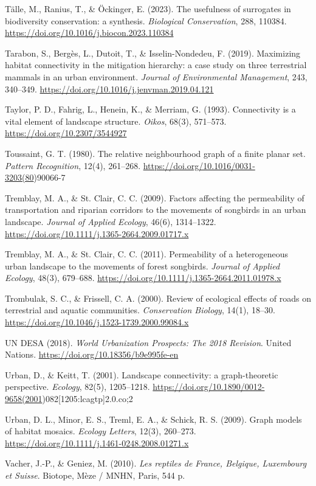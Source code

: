 \documentclass[a4paper,11pt]{report}
\begin{document}
Tälle, M., Ranius, T., \& Öckinger, E. (2023). The usefulness of surrogates in biodiversity conservation: a synthesis. \textit{Biological Conservation}, 288, 110384. \url{https://doi.org/10.1016/j.biocon.2023.110384}

Tarabon, S., Bergès, L., Dutoit, T., \& Isselin-Nondedeu, F. (2019). Maximizing habitat connectivity in the mitigation hierarchy: a case study on three terrestrial mammals in an urban environment. \textit{Journal of Environmental Management}, 243, 340--349. \url{https://doi.org/10.1016/j.jenvman.2019.04.121}

Taylor, P. D., Fahrig, L., Henein, K., \& Merriam, G. (1993). Connectivity is a vital element of landscape structure. \textit{Oikos}, 68(3), 571--573. \url{https://doi.org/10.2307/3544927}

Toussaint, G. T. (1980). The relative neighbourhood graph of a finite planar set. \textit{Pattern Recognition}, 12(4), 261--268. \url{https://doi.org/10.1016/0031-3203(80})90066-7

Tremblay, M. A., \& St. Clair, C. C. (2009). Factors affecting the permeability of transportation and riparian corridors to the movements of songbirds in an urban landscape. \textit{Journal of Applied Ecology}, 46(6), 1314--1322. \url{https://doi.org/10.1111/j.1365-2664.2009.01717.x}

Tremblay, M. A., \& St. Clair, C. C. (2011). Permeability of a heterogeneous urban landscape to the movements of forest songbirds. \textit{Journal of Applied Ecology}, 48(3), 679--688. \url{https://doi.org/10.1111/j.1365-2664.2011.01978.x}

Trombulak, S. C., \& Frissell, C. A. (2000). Review of ecological effects of roads on terrestrial and aquatic communities. \textit{Conservation Biology}, 14(1), 18--30. \url{https://doi.org/10.1046/j.1523-1739.2000.99084.x}

UN DESA (2018). \textit{World Urbanization Prospects: The 2018 Revision}. United Nations. \url{https://doi.org/10.18356/b9e995fe-en}

Urban, D., \& Keitt, T. (2001). Landscape connectivity: a graph-theoretic perspective. \textit{Ecology}, 82(5), 1205--1218. \url{https://doi.org/10.1890/0012-9658(2001})082[1205:lcagtp]2.0.co;2

Urban, D. L., Minor, E. S., Treml, E. A., \& Schick, R. S. (2009). Graph models of habitat mosaics. \textit{Ecology Letters}, 12(3), 260--273. \url{https://doi.org/10.1111/j.1461-0248.2008.01271.x}

Vacher, J.-P., \& Geniez, M. (2010). \textit{Les reptiles de France, Belgique, Luxembourg et Suisse}. Biotope, Mèze / MNHN, Paris, 544 p.
\end{document}
